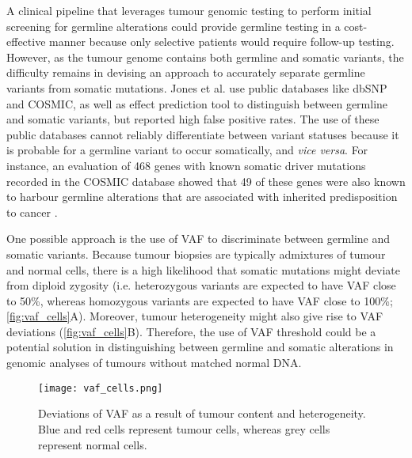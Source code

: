 A clinical pipeline that leverages tumour genomic testing to perform initial screening for germline alterations could provide germline testing in a cost-effective manner because only selective patients would require follow-up testing. However, as the tumour genome contains both germline and somatic variants, the difficulty remains in devising an approach to accurately separate germline variants from somatic mutations. Jones et al. \cite{Jones2015a} use public databases like \acs{dbSNP} and \acs{COSMIC}, as well as effect prediction tool to distinguish between germline and somatic variants, but reported high false positive rates. The use of these public databases cannot reliably differentiate between variant statuses because it is probable for a germline variant to occur somatically, and \textit{vice versa}. For instance, an evaluation of 468 genes with known somatic driver mutations recorded in the COSMIC database showed that 49 of these genes were also known to harbour germline alterations that are associated with inherited predisposition to cancer \cite{Rahman2014}.

One possible approach is the use of VAF to discriminate between germline and somatic variants. Because tumour biopsies are typically admixtures of tumour and normal cells, there is a high likelihood that somatic mutations might deviate from diploid zygosity (i.e. heterozygous variants are expected to have VAF close to 50\%, whereas homozygous variants are expected to have VAF close to 100\%; \autoref{fig:vaf_cells}A). Moreover, tumour heterogeneity might also give rise to VAF deviations (\autoref{fig:vaf_cells}B). Therefore, the use of VAF threshold could be a potential solution in distinguishing between germline and somatic alterations in genomic analyses of tumours without matched normal DNA.


\begin{figure}[H]
	\centering
	\texttt{[image: vaf\_cells.png]}
	\caption[Deviations of VAF as a result of tumour content and heterogeneity.]{Deviations of VAF as a result of tumour content and heterogeneity. Blue and red cells represent tumour cells, whereas grey cells represent normal cells.}
	\label{fig:vaf_cells}
\end{figure}



